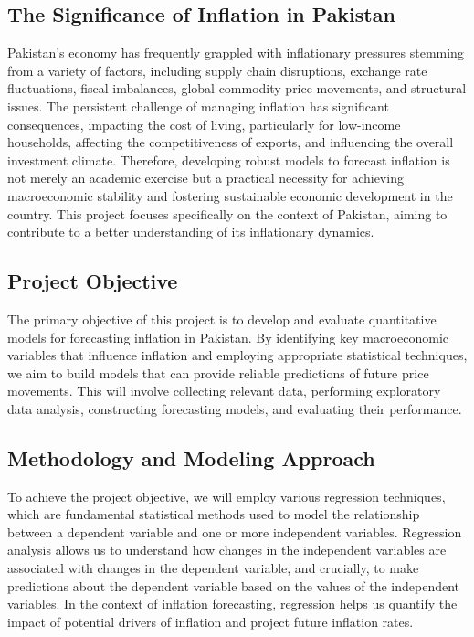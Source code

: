 \documentclass[12pt,a4paper]{article}
\begin{document}
\subsection{The Significance of Inflation in Pakistan}
Pakistan's economy has frequently grappled with inflationary pressures stemming from a variety of factors, including supply chain disruptions, exchange rate fluctuations, fiscal imbalances, global commodity price movements, and structural issues. The persistent challenge of managing inflation has significant consequences, impacting the cost of living, particularly for low-income households, affecting the competitiveness of exports, and influencing the overall investment climate. Therefore, developing robust models to forecast inflation is not merely an academic exercise but a practical necessity for achieving macroeconomic stability and fostering sustainable economic development in the country. This project focuses specifically on the context of Pakistan, aiming to contribute to a better understanding of its inflationary dynamics.

\subsection{Project Objective}
The primary objective of this project is to develop and evaluate quantitative models for forecasting inflation in Pakistan. By identifying key macroeconomic variables that influence inflation and employing appropriate statistical techniques, we aim to build models that can provide reliable predictions of future price movements. This will involve collecting relevant data, performing exploratory data analysis, constructing forecasting models, and evaluating their performance.

\subsection{Methodology and Modeling Approach}
To achieve the project objective, we will employ various regression techniques, which are fundamental statistical methods used to model the relationship between a dependent variable and one or more independent variables. Regression analysis allows us to understand how changes in the independent variables are associated with changes in the dependent variable, and crucially, to make predictions about the dependent variable based on the values of the independent variables. In the context of inflation forecasting, regression helps us quantify the impact of potential drivers of inflation and project future inflation rates.
\end{document}
